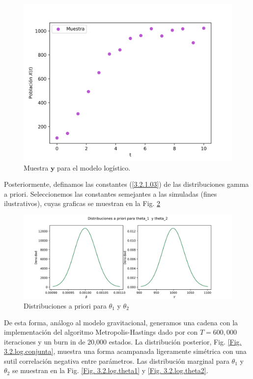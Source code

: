 \begin{figure}[H] 
    \centering 
    \includegraphics[width = 10 cm ]{img/Exp_Central_logistico_sigma/Figuras/Generales/Muestra_logistico_sigma.png} 
    \caption{Muestra $\mathbf{y}$ para el modelo logístico.}
    \label{Fig. 3.2.log.muestra}
\end{figure} 

Posteriormente, definamos las constantes (\ref{3.2.1.03}) de las distribuciones gamma a priori. Seleccionemos las constantes semejantes a las simuladas (fines ilustrativos), cuyas graficas se muestran en la Fig. \ref{Fig. 3.2.log.priori}

\begin{figure} 
    \centering 
    \includegraphics[width = 15 cm]{img/Exp_Central_logistico_sigma/Figuras/Generales/Apriori_logistico_sigma.png}     
    \caption{Distribuciones a priori para $\theta_1$ y $\theta_2$}
    \label{Fig. 3.2.log.priori}
\end{figure} 

De esta forma, análogo al modelo gravitacional, generamos una cadena con la implementación del algoritmo Metropolis-Hastings dado por \cite{christen2010general} con $T = 600,000$ iteraciones y un burn in de 20,000 estados. La distribución posterior, Fig. \ref{Fig. 3.2.log.conjunta}, muestra una forma acampanada ligeramente simétrica con una sutil correlación negativa entre parámetros. Las distribución marginal para $\theta_1$ y $\theta_2$ se muestran en la Fig. \ref{Fig. 3.2.log.theta1} y \ref{Fig. 3.2.log.theta2}.

